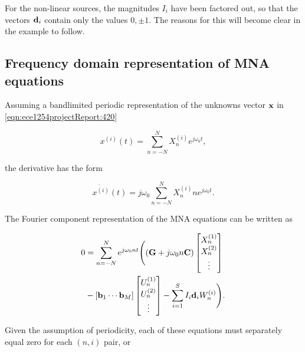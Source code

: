 \documentclass[12pt,journal,compsoc]{../ieeepaper/IEEEtran}
\begin{document}
For the non-linear sources, the magnitudes \( I_i \) have been factored out, so that the vectors \( \mathbf{d}_i \) contain only the values \( 0, \pm 1 \).  The reasons for this will become clear in the example to follow.

\subsection{Frequency domain representation of MNA equations}

Assuming a bandlimited periodic representation of the unknowns vector \( \mathbf{x} \) in \cref{eqn:ece1254projectReport:420}

\begin{equation}\label{eqn:ece1254projectReport:500}
x^{(i)}(t) = \sum_{n=-N}^N X_n^{(i)} e^{j \omega_0 t},
\end{equation}

the derivative has the form

\begin{equation}\label{eqn:ece1254projectReport:520}
\dot{x^{(i)}}(t) = j \omega_0 \sum_{n=-N}^N X_n^{(i)} n e^{j \omega_0 t}.
\end{equation}

The Fourier component representation of the MNA equations can be written as

\begin{equation}\label{eqn:ece1254projectReport:600}
\begin{aligned}
0 &= \sum_{n = -N}^N e^{j \omega_0 n t}
\Biglr{
   \lr{ \BG + j \omega_0 n \BC } 
\begin{bmatrix}
X_n^{(1)} \\
X_n^{(2)} \\
\vdots \\
\end{bmatrix} \\
&- 
[ \Bb_1 \cdots \Bb_M ]
\begin{bmatrix}
U_n^{(1)} \\
U_n^{(2)} \\
\vdots \\
\end{bmatrix}
- \sum_{i = 1}^S I_i \Bd_i
W_n^{(i)} 
}.
\end{aligned}
\end{equation}

Given the 
assumption of periodicity, each of these equations must separately equal zero for each \( ( n, i ) \) pair, or
\end{document}
